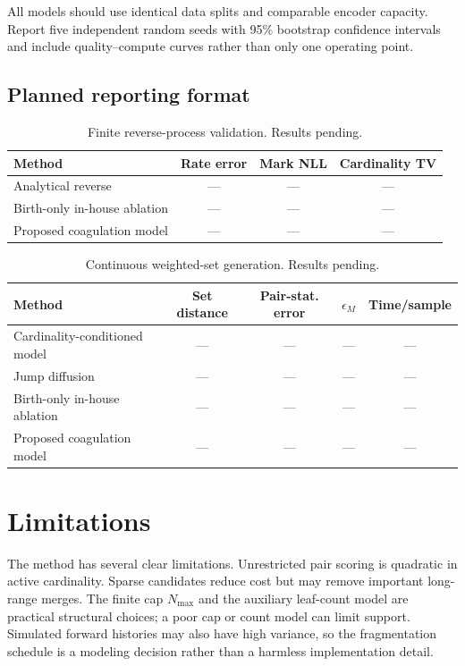 \documentclass[10pt]{article}
\theoremstyle{definition}
\theoremstyle{remark}
\begin{document}
All models should use identical data splits and comparable encoder capacity.
Report five independent random seeds with 95\% bootstrap confidence intervals
and include quality--compute curves rather than only one operating point.

\subsection{Planned reporting format}

\begin{table}[h]
\centering
\caption{Finite reverse-process validation.  Results pending.}
\begin{tabular}{lccc}
\toprule
Method & Rate error & Mark NLL & Cardinality TV \\
\midrule
Analytical reverse & --- & --- & --- \\
Birth-only in-house ablation & --- & --- & --- \\
Proposed coagulation model & --- & --- & --- \\
\bottomrule
\end{tabular}
\end{table}

\begin{table}[h]
\centering
\caption{Continuous weighted-set generation.  Results pending.}
\begin{tabular}{lcccc}
\toprule
Method & Set distance & Pair-stat. error & $\epsilon_M$ & Time/sample \\
\midrule
Cardinality-conditioned model & --- & --- & --- & --- \\
Jump diffusion & --- & --- & --- & --- \\
Birth-only in-house ablation & --- & --- & --- & --- \\
Proposed coagulation model & --- & --- & --- & --- \\
\bottomrule
\end{tabular}
\end{table}

\section{Limitations}

The method has several clear limitations.  Unrestricted pair scoring is
quadratic in active cardinality.  Sparse candidates reduce cost but may
remove important long-range merges.  The finite cap $N_{\max}$ and the
auxiliary leaf-count model are practical structural choices; a poor cap or
count model can limit support.  Simulated forward histories may also have
high variance, so the fragmentation schedule is a modeling decision rather
than a harmless implementation detail.
\end{document}
